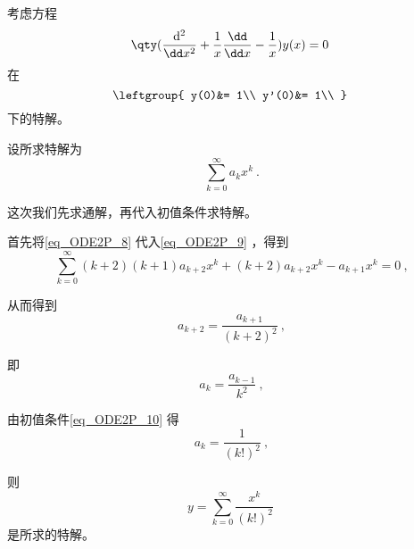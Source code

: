 \begin{example}{}\label{ex_ODE2P_2}
考虑方程
\begin{equation}\label{eq_ODE2P_9}
\qty(\frac{\mathrm{d}^2}{\dd x^2}+\frac{1}{x}\frac{\dd}{\dd x}-\frac{1}{x})y(x)=0~
\end{equation}
在
\begin{equation}\label{eq_ODE2P_10}
\leftgroup{
    y(0)&= 1\\
    y'(0)&= 1\\
}~
\end{equation}
下的特解。

设所求特解为
\begin{equation}\label{eq_ODE2P_8}
\sum\limits_{k=0}^\infty a_kx^k~.
\end{equation}

这次我们先求通解，再代入初值条件求特解。

首先将\autoref{eq_ODE2P_8} 代入\autoref{eq_ODE2P_9} ，得到
\begin{equation}
\sum\limits_{k=0}^\infty (k+2)(k+1)a_{k+2}x^k+(k+2)a_{k+2}x^k-a_{k+1}x^k=0~,
\end{equation}

从而得到
\begin{equation}
a_{k+2}=\frac{a_{k+1}}{(k+2)^2}~,
\end{equation}

即
\begin{equation}\label{eq_ODE2P_11}
a_k=\frac{a_{k-1}}{k^2}~,
\end{equation}

由初值条件\autoref{eq_ODE2P_10} 得
\begin{equation}
a_k=\frac{1}{(k!)^2}~,
\end{equation}

则
\begin{equation}
y=\sum\limits_{k=0}^\infty \frac{x^k}{(k!)^2}~
\end{equation}
是所求的特解。


\end{example}




